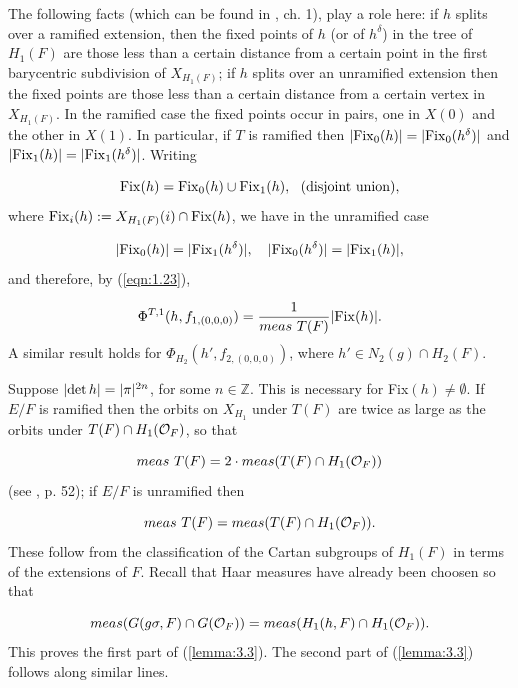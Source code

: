 \documentclass[12pt,letterpaper]{article}
\def\zzz{\mathbb{Z}}
\def\off{{\cal O}_F}
\begin{document}
The following facts (which can be found in \cite{Bl}, ch. 1), 
play a role here: if $h$ splits over a
ramified extension, then the fixed points of $h$ (or of $h^\delta $) in
the tree of $H_1(F)$ are those less than a certain distance
from a certain point in the first barycentric
subdivision of $X_{H_1(F)}$; if $h$ splits over an unramified extension
then the fixed points are those less than a certain distance from a 
certain vertex in $X_{H_1(F)}$. In the ramified case the fixed 
points occur in pairs, one in $X(0)$ and
the other in $X(1)$. In particular, if $T$ is ramified then 
$|{\rm Fix} _0(h)| = |{\rm Fix} _0(h^\delta )|$ and
$|{\rm Fix} _1(h)| = |{\rm Fix} _1(h^\delta )|$. Writing

\[
{\rm Fix}(h) = {\rm Fix} _0(h)\cup {\rm Fix}_1(h),
\ \ {\rm (disjoint\ union)},
\]
where ${\rm Fix}_i(h):= X_{H_1(F)}(i)\cap {\rm Fix} (h)$, we have
in the unramified case

\[
|{\rm Fix} _0(h)|=|{\rm Fix} _1(h^\delta )|,
\ \ \ |{\rm Fix} _0(h^\delta )|=|{\rm Fix} _1(h)|,
\]
and therefore, by (\ref{eqn:1.23}),

\begin{equation}
\label{eqn:3.12}
\Phi^{T,1}(h,f_{1,(0,0,0)}) = {1\over{meas\ T(F)}}|{\rm Fix} (h)|.
\end{equation}
A similar result holds for $\Phi_{H_2}(h',f_{2,(0,0,0)})$, where
$h'\in N_2(g)\cap H_2(F)$.
 
Suppose $|{\rm det }\, h| =|\pi |^{2n}$, for some $n\in\zzz$. This is 
necessary for Fix$(h)\not=\emptyset$. If $E/F$ is ramified then the
orbits on $X_{H_1}$ under $T(F)$ are twice as large as the orbits under
$T(F)\cap H_1(\off )$, so that

\begin{equation}
\label{eqn:3.13}
meas\ T(F) = 2\cdot meas(T(F)\cap H_1(\off ))
\end{equation}
(see \cite{La3}, p. 52); if $E/F$ is unramified then

\begin{equation}
\label{eqn:3.14}
meas\ T(F)= meas(T(F)\cap H_1(\off )).
\end{equation}
These follow from the classification of the Cartan 
subgroups of $H_1(F)$ in terms
of the extensions of $F$. Recall that Haar measures have already been choosen 
so that 

\[
meas(G(g\sigma ,F)\cap G(\off ))=meas(H_1(h,F)\cap H_1(\off )).
\]
This proves the first part of (\ref{lemma:3.3}). 
The second part of (\ref{lemma:3.3}) follows along 
similar lines.
 
\end{document}
